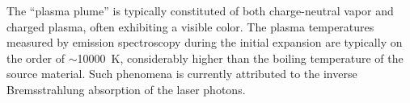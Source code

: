 The ``plasma plume'' is typically constituted of both charge-neutral vapor and charged plasma, often exhibiting a visible color. The plasma temperatures measured by emission spectroscopy during the initial expansion are typically on the order of $\sim$\SI{10000}{K}, considerably higher than the boiling temperature of the source material. Such phenomena is currently attributed to the inverse Bremsstrahlung absorption of the laser photons.


